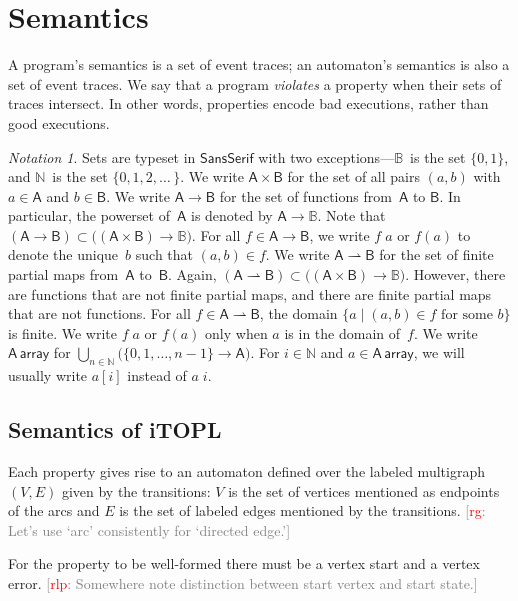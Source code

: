 \documentclass[preprint]{sigplanconf} %
\newcommand{\note}[2]{\textcolor{gray}{[\textcolor{red}{#1}: #2]}}
\newcommand{\rg}[1]{\note{rg}{#1}}
\newcommand{\rlp}[1]{\note{rlp}{#1}}
\newcommand{\B}{\ensuremath{\mathbb{B}}}
\newcommand{\N}{\ensuremath{\mathbb{N}}}
\newcommand{\pmap}{\rightharpoonup}
\newcommand{\set}[1]{\ensuremath{\mathsf{#1}}}
\theoremstyle{definition}
\theoremstyle{remark}
\newtheorem{notation}{Notation}
\begin{document}
\section{Semantics}\label{sec:semantics} %

A program's semantics is a set of event traces;
an automaton's semantics is also a set of event traces.
We say that a program \emph{violates} a property when their sets of traces intersect.
In other words, properties encode bad executions, rather than good executions.

\begin{notation}
Sets are typeset in \set{SansSerif} with two exceptions---$\B$~is the set $\{0,1\}$, and $\N$~is the set $\{0,1,2,\ldots\,\}$.
We write $\set A\times\set B$ for the set of all pairs $(a,b)$ with $a\in\set A$ and $b\in\set B$.
We write $\set A\to\set B$ for the set of functions from~\set A to \set B.
In particular, the powerset of~\set A is denoted by $\set A\to\B$.
Note that $(\set A\to\set B)\subset\bigl((\set A\times\set B)\to\B\bigr)$.
For all $f\in\set A\to\set B$, we write $f\;a$ or $f(a)$ to denote the unique~$b$ such that $(a,b)\in f$.
We write $\set A\pmap\set B$ for the set of finite partial maps from~\set A to~\set B.
Again, $(\set A\pmap\set B)\subset\bigl((\set A\times\set B)\to\B\bigr)$.
However, there are functions that are not finite partial maps, and there are finite partial maps that are not functions.
For all $f\in\set A\pmap\set B$, the domain $\{a\mid\text{$(a,b)\in f$ for some $b$}\}$ is finite.
We write $f\;a$ or $f(a)$ only when $a$ is in the domain of~$f$.
We write $\set A\,\mathsf{array}$ for $\bigcup_{n\in\N}
\bigl(\{0,1,\ldots,n-1\}\to\set A\bigr)$.
For $i\in\N$ and $a\in\set A\,\mathsf{array}$, we will usually write $a[i]$
instead of $a\;i$.
\end{notation}

\subsection{Semantics of iTOPL}\label{sec:semantics.itopl} %
Each property gives rise to an automaton defined over the labeled multigraph $(V, E)$ given
by the transitions: $V$ is the set of vertices mentioned as endpoints of
the arcs and $E$ is the set of labeled edges mentioned by the
transitions.
\rg{Let's use `arc' consistently for `directed edge.'}

For the property to be well-formed there must be a vertex start and a
vertex error.
\rlp{Somewhere note distinction between start vertex and start
  state.}
\end{document}

